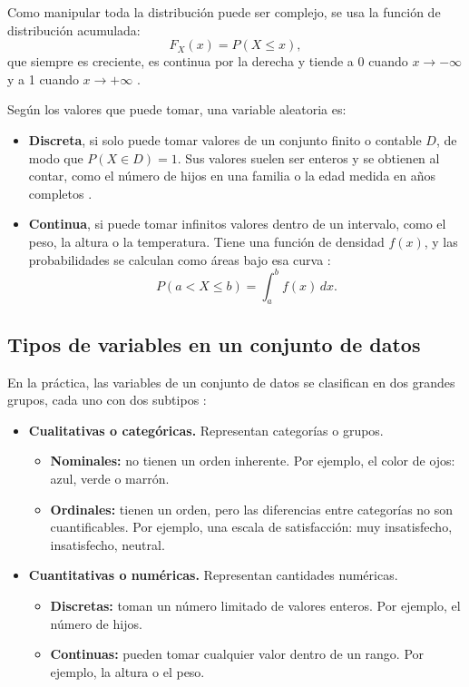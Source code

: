 \documentclass[11pt,letterpaper]{article}
\begin{document}
Como manipular toda la distribución puede ser complejo, se usa la función de distribución acumulada:
\begin{equation}
    F_X(x) = P(X \leq x),
\end{equation}
que siempre es creciente, es continua por la derecha y tiende a 0 cuando $x \to -\infty$ y a 1 cuando $x \to +\infty$ \parencite{tecnm2026_documento_fuente}.

Según los valores que puede tomar, una variable aleatoria es:

\begin{itemize}
    \item \textbf{Discreta}, si solo puede tomar valores de un conjunto finito o contable $D$, de modo que $P(X \in D) = 1$. Sus valores suelen ser enteros y se obtienen al contar, como el número de hijos en una familia o la edad medida en años completos \parencite{tecnm2026_documento_fuente}.
    \item \textbf{Continua}, si puede tomar infinitos valores dentro de un intervalo, como el peso, la altura o la temperatura. Tiene una función de densidad $f(x)$, y las probabilidades se calculan como áreas bajo esa curva \parencite{tecnm2026_documento_fuente}:
    \begin{equation}
        P(a < X \leq b) = \int_a^b f(x)\, dx.
    \end{equation}
\end{itemize}

\subsection{Tipos de variables en un conjunto de datos}

En la práctica, las variables de un conjunto de datos se clasifican en dos grandes grupos, cada uno con dos subtipos \parencite{tecnm2026_documento_fuente,bruce2020}:

\begin{itemize}
    \item \textbf{Cualitativas o categóricas.} Representan categorías o grupos.
    \begin{itemize}
        \item \textbf{Nominales:} no tienen un orden inherente. Por ejemplo, el color de ojos: azul, verde o marrón.
        \item \textbf{Ordinales:} tienen un orden, pero las diferencias entre categorías no son cuantificables. Por ejemplo, una escala de satisfacción: muy insatisfecho, insatisfecho, neutral.
    \end{itemize}
    \item \textbf{Cuantitativas o numéricas.} Representan cantidades numéricas.
    \begin{itemize}
        \item \textbf{Discretas:} toman un número limitado de valores enteros. Por ejemplo, el número de hijos.
        \item \textbf{Continuas:} pueden tomar cualquier valor dentro de un rango. Por ejemplo, la altura o el peso.
    \end{itemize}
\end{itemize}
\end{document}
